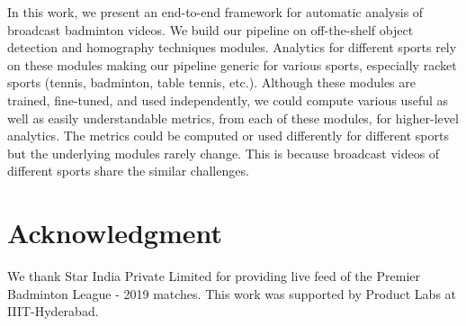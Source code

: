 \documentclass[runningheads,a4paper]{llncs}
\begin{document}
In this work, we present an end-to-end framework for automatic analysis of broadcast badminton videos. We build our pipeline on off-the-shelf object detection and homography techniques modules. Analytics for different sports rely on these modules making our pipeline generic for various sports, especially racket sports (tennis, badminton, table tennis, etc.). Although these modules are trained, fine-tuned, and used independently, we could compute various useful as well as easily understandable metrics, from each of these modules, for higher-level analytics. The metrics could be computed or used differently for different sports but the underlying modules rarely change. This is because broadcast videos of different sports share the similar challenges.

\section{Acknowledgment}
We thank Star India Private Limited for providing live feed of the Premier Badminton League - 2019 matches. This work was supported by Product Labs at IIIT-Hyderabad.


\end{document}
